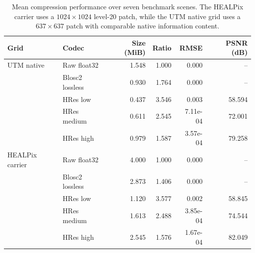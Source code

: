\begin{table}[t]
\centering
\caption{Mean compression performance over seven benchmark scenes. The HEALPix carrier uses a $1024\times1024$ level-20 patch, while the UTM native grid uses a $637\times637$ patch with comparable native information content.}
\label{tab:grid_codec_summary}
\begin{tabular}{@{}llrrrr@{}}
\toprule
Grid & Codec & Size (MiB) & Ratio & RMSE & PSNR (dB) \\
\midrule
UTM native & Raw float32 & 1.548 & 1.000 & 0.000 & -- \\
 & Blosc2 lossless & 0.930 & 1.764 & 0.000 & -- \\
 & HRes low & 0.437 & 3.546 & 0.003 & 58.594 \\
 & HRes medium & 0.611 & 2.545 & 7.11e-04 & 72.001 \\
 & HRes high & 0.979 & 1.587 & 3.57e-04 & 79.258 \\
\midrule
HEALPix carrier & Raw float32 & 4.000 & 1.000 & 0.000 & -- \\
 & Blosc2 lossless & 2.873 & 1.406 & 0.000 & -- \\
 & HRes low & 1.120 & 3.577 & 0.002 & 58.845 \\
 & HRes medium & 1.613 & 2.488 & 3.85e-04 & 74.544 \\
 & HRes high & 2.545 & 1.576 & 1.67e-04 & 82.049 \\
\bottomrule
\end{tabular}
\end{table}
